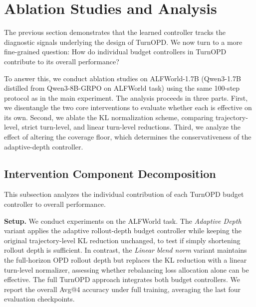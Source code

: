 \section{Ablation Studies and Analysis}
\label{sec:exp:abl}

The previous section demonstrates that the learned controller tracks the diagnostic signals underlying the design of TurnOPD. We now turn to a more fine-grained question: How do individual budget controllers in TurnOPD contribute to its overall performance? 

To answer this, we conduct ablation studies on ALFWorld-1.7B (Qwen3-1.7B distilled from Qwen3-8B-GRPO on ALFWorld task) using the same 100-step protocol as in the main experiment. The analysis proceeds in three parts. First, we disentangle the two core interventions to evaluate whether each is effective on its own. Second, we ablate the KL normalization scheme, comparing trajectory-level, strict turn-level, and linear turn-level reductions. Third, we analyze the effect of altering the coverage floor, which determines the conservativeness of the adaptive-depth controller.

\subsection{Intervention Component Decomposition}
\label{sec:exp:intervention-decomposition}

This subsection analyzes the individual contribution of each TurnOPD budget controller to overall performance.

\textbf{Setup.}
We conduct experiments on the ALFWorld task.
The \textit{Adaptive Depth} variant applies the adaptive rollout-depth budget controller while keeping the original trajectory-level KL reduction unchanged, to test if simply shortening rollout depth is sufficient. In contrast, the \textit{Linear blend norm} variant maintains the full-horizon OPD rollout depth but replaces the KL reduction with a linear turn-level normalizer, assessing whether rebalancing loss allocation alone can be effective. The full TurnOPD approach integrates both budget controllers. We report the overall Avg@4 accuracy under full training, averaging the last four evaluation checkpoints.


